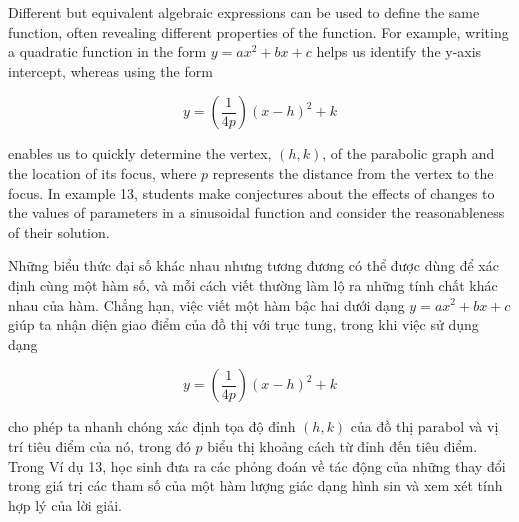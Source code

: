 \documentclass[
  10pt,
  a4paper,
  landscape,
  twoside,
  openany
]{scrbook}
\newcommand{\EN}[1]{#1}
\newcommand{\VI}[1]{#1}
\newcommand{\NOTE}[1]{#1}
\newcounter{example}
\begin{document}
\TriPara
{
\EN{Different but equivalent algebraic expressions can be used to define the same function, often revealing different properties of the function. For example, writing a quadratic function in the form $y = ax^2 + bx + c$ helps us identify the y-axis intercept, whereas using the form

$$
y=\left(\frac{1}{4p}\right)(x-h)^2+k
$$

enables us to quickly determine the vertex, $(h, k)$, of the parabolic graph and the location of its focus, where $p$ represents the distance from the vertex to the focus. In example 13, students make conjectures about the effects of changes to the values of parameters in a sinusoidal function and consider the reasonableness of their solution.}
}
{
\VI{Những biểu thức đại số khác nhau nhưng tương đương có thể được dùng để xác định cùng một hàm số, và mỗi cách viết thường làm lộ ra những tính chất khác nhau của hàm. Chẳng hạn, việc viết một hàm bậc hai dưới dạng $y = ax^2 + bx + c$ giúp ta nhận diện giao điểm của đồ thị với trục tung, trong khi việc sử dụng dạng

$$
y=\left(\frac{1}{4p}\right)(x-h)^2+k
$$

cho phép ta nhanh chóng xác định tọa độ đỉnh $(h, k)$ của đồ thị parabol và vị trí tiêu điểm của nó, trong đó $p$ biểu thị khoảng cách từ đỉnh đến tiêu điểm. Trong Ví dụ 13, học sinh đưa ra các phỏng đoán về tác động của những thay đổi trong giá trị các tham số của một hàm lượng giác dạng hình sin và xem xét tính hợp lý của lời giải.}
}
{
\NOTE{}
}
\end{document}
